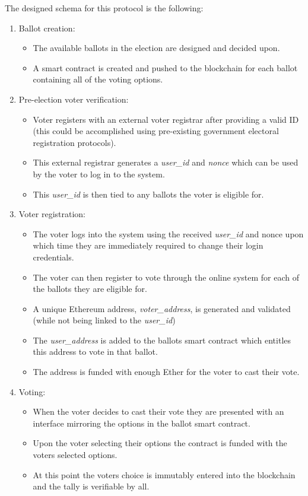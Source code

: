 \documentclass{article}
\begin{document}
The designed schema for this protocol is the following:
\begin{enumerate}

\item Ballot creation:
	\begin{itemize}
		\item The available ballots in the election are designed and decided upon.
		\item A smart contract is created and pushed to the blockchain for each ballot containing all of the voting options.
	\end{itemize}

\item Pre-election voter verification:
	\begin{itemize}
		\item Voter registers with an external voter registrar after providing a valid ID (this could be accomplished using pre-existing government electoral registration protocols).
		\item This external registrar generates a \textit{user\_id} and \textit{nonce} which can be used by the voter to log in to the system.
		\item This \textit{user\_id} is then tied to any ballots the voter is eligible for.
	\end{itemize}
	
\item Voter registration:
	\begin{itemize}
		\item The voter logs into the system using the received \textit{user\_id} and nonce upon which time they are immediately required to change their login credentials.
		\item The voter can then register to vote through the online system for each of the ballots they are eligible for.
		\item A unique Ethereum address, \textit{voter\_address}, is generated and validated (while not being linked to the \textit{user\_id})
		\item The \textit{user\_address} is added to the ballots smart contract which entitles this address to vote in that ballot.
		\item The address is funded with enough Ether for the voter to cast their vote.
	\end{itemize}

\item Voting:
	\begin{itemize}
		\item When the voter decides to cast their vote they are presented with an interface mirroring the options in the ballot smart contract.
		\item Upon the voter selecting their options the contract is funded with the voters selected options.
		\item At this point the voters choice is immutably entered into the blockchain and the tally is verifiable by all.
	\end{itemize}


\end{enumerate}
\end{document}
